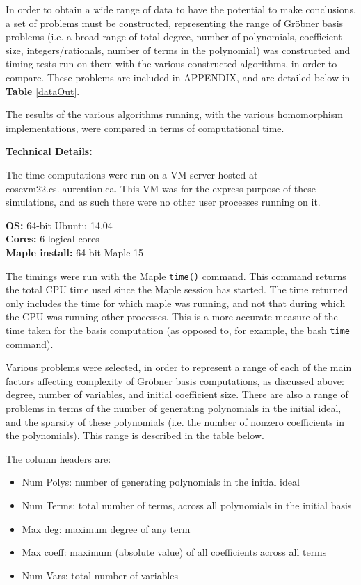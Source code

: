 \documentclass[letterpaper,12pt,titlepage,oneside,final]{book}
\newcounter{Table}
\begin{document}
In order to obtain a wide range of data to have the potential to make conclusions, a set of problems must be constructed, representing the range of Gr\"obner basis problems (i.e. a broad range of total degree, number of polynomials, coefficient size, integers/rationals, number of terms in the polynomial) was constructed and timing tests run on them with the various constructed algorithms, in order to compare.  These problems are included in APPENDIX, and are detailed below in \textbf{Table} \ref{dataOut}.

The results of the various algorithms running, with the various homomorphism implementations, were compared in terms of computational time.  

\noindent \textbf{Technical Details:}

The time computations were run on a VM server hosted at coscvm22.cs.laurentian.ca.  This VM was for the express purpose of these simulations, and as such there were no other user processes running on it.

\noindent \textbf{OS:} 64-bit Ubuntu 14.04\\
\textbf{Cores:} 6 logical cores\\
\textbf{Maple install:} 64-bit Maple 15

The timings were run with the Maple \texttt{time()} command.  This command returns the total CPU time used since the Maple session has started.  The time returned only includes the time for which maple was running, and not that during which the CPU was running other processes.  This is a more accurate measure of the time taken for the basis computation (as opposed to, for example, the bash \texttt{time} command).

Various problems were selected, in order to represent a range of each of the main factors affecting complexity of Gr\"obner basis computations, as discussed above: degree, number of variables, and initial coefficient size.  There are also a range of problems in terms of the number of generating polynomials in the initial ideal, and the sparsity of these polynomials (i.e. the number of nonzero coefficients in the polynomials).  This range is described in the table below.

The column headers are:
\begin{itemize}
  \item Num Polys: number of generating polynomials in the initial ideal 
  \item Num Terms: total number of terms, across all polynomials in the initial basis
  \item Max deg: maximum degree of any term
  \item Max coeff: maximum (absolute value) of all coefficients across all terms
  \item Num Vars: total number of variables 
\end{itemize} 
\end{document}
